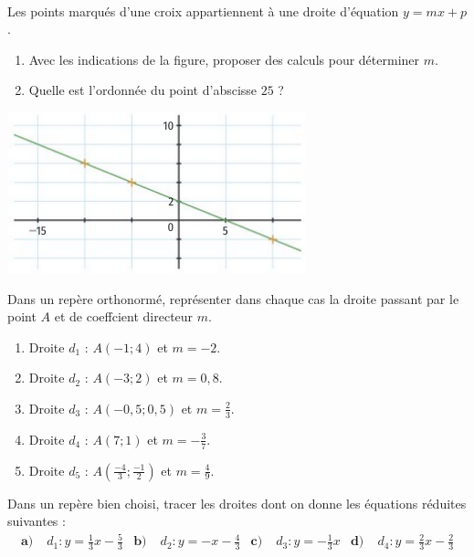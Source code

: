 \documentclass[11pt]{article}
\begin{document}
\begin{exo}~\\
  \begin{minipage}[]{.5\textwidth}
    Les points marqués d'une croix appartiennent à une droite d'équation $y =
    mx+p$.
    \begin{enumerate}
      \item Avec les indications de la figure, proposer des calculs pour
        déterminer $m$.
      \item Quelle est l'ordonnée du point d'abscisse $25$ ?
    \end{enumerate}
  \end{minipage}
  \begin{minipage}[]{.5\textwidth}
    \begin{center}
      \includegraphics[scale=.7]{exo3.png}
    \end{center}
  \end{minipage}
\end{exo}

\begin{exo}
  Dans un repère orthonormé, représenter dans chaque cas la droite passant par
  le point $A$ et de coeffcient directeur $m$.
\begin{multicols}{2}
  \begin{enumerate}
    \item Droite $d_1$ : $A\left( -1; 4 \right)$ et $m=-2$.
    \item Droite $d_2$ : $A\left( -3; 2 \right)$ et $m=0,8$.
    \item Droite $d_3$ : $A\left( -0,5; 0,5 \right)$ et $m=\frac{2}{3}$.
    \item Droite $d_4$ : $A\left( 7; 1 \right)$ et $m=-\frac{3}{7}$.
    \item Droite $d_5$ : $A\left( \frac{-4}{3}; \frac{-1}{2}\right)$ et
      $m=\frac{4}{9}$.
  \end{enumerate}
\end{multicols}
\end{exo}

\begin{exo}
  Dans un repère bien choisi, tracer les droites dont on donne les équations
  réduites suivantes :
  \begin{align*}
    \textbf{a)}\; & d_1: y = \frac{1}{3}x - \frac{5}{3} &
    \textbf{b)}\; & d_2: y = -x - \frac{4}{3} &
    \textbf{c)}\; & d_3: y = -\frac{1}{3}x &
    \textbf{d)}\; & d_4: y = \frac{2}{3}x - \frac{2}{3}
  \end{align*}
\end{exo}
\end{document}
